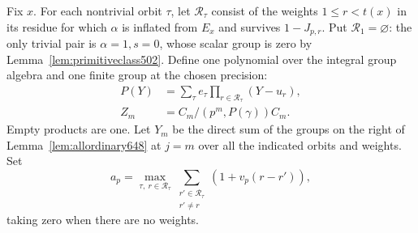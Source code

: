 \documentclass[a4paper,11pt]{article}
\theoremstyle{definition}
\theoremstyle{remark}
\numberwithin{equation}{section}
\begin{document}
Fix \(x\). For each nontrivial orbit \(\tau\), let
\(\mathcal R_\tau\) consist of the weights \(1\le r<t(x)\)
in its residue for which \(\alpha\) is inflated from \(E_x\)
and survives \(1-J_{p,r}\). Put \(\mathcal R_1=\varnothing\):
the only trivial pair is \(\alpha=1,s=0\), whose scalar group
is zero by Lemma~\ref{lem:primitiveclass502}.
Define one polynomial over the integral group algebra and
one finite group at the chosen precision:
\[
 \begin{aligned}
   P(Y)&=\sum_\tau e_\tau\prod_{r\in\mathcal R_\tau}(Y-u_r),\\
   Z_m&=C_m/(p^m,P(\gamma))C_m .
 \end{aligned}
\]
Empty products are one. Let \(Y_m\) be the direct sum of
the groups on the right of Lemma~\ref{lem:allordinary648}
at \(j=m\) over all the indicated orbits and weights. Set
\[
 a_p=\max_{\tau,\ r\in\mathcal R_\tau}
           \sum_{\substack{r'\in\mathcal R_\tau\\r'\ne r}}
                                (1+v_p(r-r')),
\]
taking zero when there are no weights.
\end{document}
